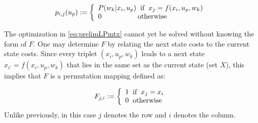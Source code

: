 \documentclass[conference]{IEEEtran}
\begin{document}
\begin{displaymath}
p_{i,j}(u_{p}):=
\left\{
\begin{array}{l}
P(w_{k}|x_{i},u_{p}) \hspace{0.2cm} \text{if} \hspace{0.2cm} x_{j}=f(x_{i},u_{p},w_{k})\\
0 \hspace{1.8cm} \text{otherwise}
\end{array}
\right.
\end{displaymath}




The optimization in \eqref{eq:prelimLPmtx} cannot yet be solved without knowing the form of $F$. One may determine $F$ by relating the next state costs to the current state costs. Since every triplet $(x_{i},u_{p},w_{k})$ leads to a next state $x_{i'}=f(x_{i},u_{p},w_{k})$ that lies in the same set as the current state (set $X$), this implies that $F$ is a permutation mapping defined as:

\begin{displaymath}
F_{j,i}:=
\left\{
\begin{array}{l}
1\hspace{0.2cm} \text{if} \hspace{0.2cm}x_{j}=x_{i}\\
0\hspace{0.2cm} \text{otherwise}
\end{array}
\right.
\end{displaymath} Unlike previously, in this case $j$ denotes the row and $i$ denotes the column.
\end{document}
